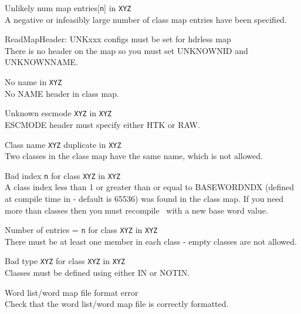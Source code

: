 \begin{itemize}
\begin{itemize}
\end{itemize}




\begin{itemize}
  Unlikely num map entries[\texttt{n}] in \texttt{XYZ}\\
        A negative or infeasibly large number of class map entries
        have been specified.

 ReadMapHeader: UNKxxx configs must be set for hdrless map\\
        There is no header on the map so you must set UNKNOWNID and UNKNOWNNAME.

 No name in \texttt{XYZ}\\
        No NAME header in class map.

 Unknown escmode \texttt{XYZ} in \texttt{XYZ}\\
        ESCMODE header must specify either HTK or RAW.

 Class name  \texttt{XYZ} duplicate in \texttt{XYZ}\\
        Two classes in the class map have the same name, which is not allowed.

 Bad index \texttt{n} for class \texttt{XYZ} in \texttt{XYZ}\\
        A class index less than 1 or greater than or equal to BASEWORDNDX (defined
        at compile time in  - default is 65536) was found
        in the class map.  If you need more than 
        classes then you must recompile \HTK\ with a new base word
        value.

 Number of entries =  \texttt{n} for class \texttt{XYZ} in \texttt{XYZ}\\
        There must be at least one member in each class - empty
        classes are not allowed.

 Bad type \texttt{XYZ} for class \texttt{XYZ} in \texttt{XYZ}\\
        Classes must be defined using either IN or NOTIN.
\end{itemize}



\begin{itemize}
   Word list/word map file format error\\
        Check that the word list/word map file is correctly formatted.


\end{itemize}
\end{itemize}

